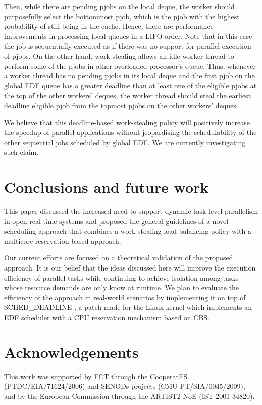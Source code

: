 \documentclass[10pt,twocolumn]{article}
\begin{document}
Then, while there are pending pjobs on the local deque, the worker should purposefully select the bottommost pjob, which is the pjob with the highest probability of still being in the cache. Hence, there are performance improvements in processing local queues in a LIFO order. Note that in this case the job is sequentially executed as if there was no support for parallel execution of pjobs. On the other hand, work stealing allows an idle worker thread to perform some of the pjobs in other overloaded processor's queue. Thus, whenever a worker thread has no pending pjobs in its local deque and the first pjob on the global EDF queue has a greater deadline than at least one of the eligible pjobs at the top of the other workers' deques, the worker thread should steal the earliest deadline eligible pjob from the topmost pjobs on the other workers' deques. 

We believe that this deadline-based work-stealing policy will positively increase the speedup of parallel applications without jeopardising the schedulability of the other sequential jobs scheduled by global EDF. We are currently investigating such claim. 

\section{Conclusions and future work}

This paper discussed the increased need to support dynamic task-level parallelism in open real-time systems and proposed the general guidelines of a novel scheduling approach that combines a work-stealing load balancing policy with a multicore reservation-based approach.  

Our current efforts are focused on a theoretical validation of the proposed approach. It is our belief that the ideas discussed here will improve the execution efficiency of parallel tasks while continuing to achieve isolation among tasks whose resource demands are only know at runtime. We plan to evaluate the efficiency of the approach in real-world scenarios by implementing it on top of SCHED\_DEADLINE \cite{faggioli09}, a patch made for the Linux kernel which implements an EDF scheduler with a CPU reservation mechanism based on CBS.

\section*{Acknowledgements}
This work was supported by FCT through the CooperatES (PTDC/EIA/71624/2006) and SENODs projects (CMU-PT/SIA/0045/2009), and by the European Commission through the ARTIST2 NoE (IST-2001-34820).




\end{document}
